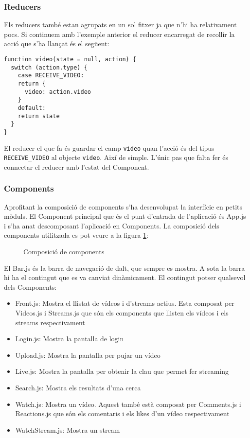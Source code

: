 \documentclass[12pt, titlepage]{article}
\begin{document}
\subsubsection{Reducers}

Els reducers també estan agrupats en un sol fitxer ja que n'hi ha relativament pocs.
Si continuem amb l'exemple anterior el reducer encarregat de recollir la acció que
s'ha llançat és el següent:
\begin{lstlisting}[breaklines]
function video(state = null, action) {
  switch (action.type) {
    case RECEIVE_VIDEO:
    return {
      video: action.video
    }
    default:
    return state
  }
}
\end{lstlisting}

El reducer el que fa és guardar el camp \verb|video| quan l'acció és del tipus
\verb|RECEIVE_VIDEO| al objecte \verb|video|. Així de simple. L'únic pas que
falta fer és connectar el reducer amb l'estat del Component.

\subsubsection{Components}

Aprofitant la composició de components s'ha desenvolupat la interfície en petits
mòduls. El Component principal que és el punt d'entrada de l'aplicació és App.js
i s'ha anat descomposant l'aplicació en Components. La composició dels components
utilitzada es pot veure a la figura \ref{clientComposition}:

\begin{figure}[H]
\begin{center}
\end{center}
\caption{Composició de components}
\label{clientComposition}
\end{figure}

El Bar.js és la barra de navegació de dalt, que sempre es mostra. A sota la
barra hi ha el contingut que es va canviat dinàmicament. El contingut potser
qualsevol dels Components:

\begin{itemize}
\item Front.js: Mostra el llistat de vídeos i d'streams actius.
Esta composat per Videos.js i Streams.js que són els components que llisten els
vídeos i els streams respectivament
\item Login.js: Mostra la pantalla de login
\item Upload.js: Mostra la pantalla per pujar un vídeo
\item Live.js: Mostra la pantalla per obtenir la clau que permet fer
streaming
\item Search.js: Mostra els resultats d'una cerca
\item Watch.js: Mostra un vídeo. Aquest també està composat per
Comments.js i Reactions.js que són els comentaris i els likes d'un vídeo respectivament
\item WatchStream.js: Mostra un stream
\end{itemize}
\end{document}
